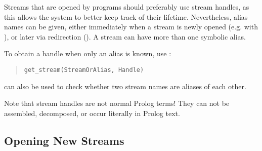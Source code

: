 Streams that are opened by programs should preferably use stream handles,
as this allows the system to better keep track of their lifetime.
Nevertheless, alias names can be given, either immediately when a stream is
newly opened (e.g. with ),
or later via redirection
().
A stream can have more than one symbolic alias.

To obtain a handle when only an alias is known, use
:
\begin{quote}
\begin{verbatim}
get_stream(StreamOrAlias, Handle)
\end{verbatim}
\end{quote}
 can also
be used to check whether two stream names are aliases of each other.

Note that stream handles are not normal Prolog terms!  They
can not be assembled, decomposed, or occur literally in Prolog text. 

\subsection{Opening New Streams}
\label{openstream}

